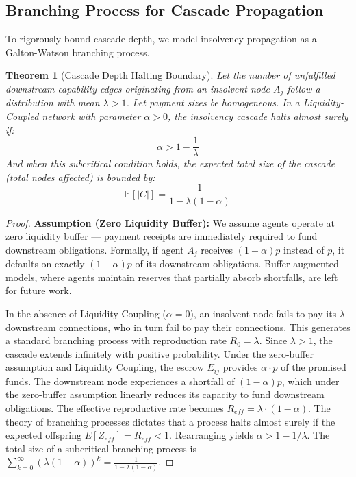 \documentclass[11pt]{article}
\newtheorem{theorem}{Theorem}[section]
\begin{document}
\subsection{Branching Process for Cascade Propagation}
To rigorously bound cascade depth, we model insolvency propagation as a Galton-Watson branching process.

\begin{theorem}[Cascade Depth Halting Boundary]
\label{thm:halting}
Let the number of unfulfilled downstream capability edges originating from an insolvent node $A_j$ follow a distribution with mean $\lambda > 1$. Let payment sizes be homogeneous. In a Liquidity-Coupled network with parameter $\alpha > 0$, the insolvency cascade halts almost surely if:
$$ \alpha > 1 - \frac{1}{\lambda} $$
And when this subcritical condition holds, the expected total size of the cascade (total nodes affected) is bounded by:
$$ \mathbb{E}[|C|] = \frac{1}{1 - \lambda(1-\alpha)} $$
\end{theorem}

\begin{proof}
\textbf{Assumption (Zero Liquidity Buffer):} We assume agents operate at zero liquidity buffer --- payment receipts are immediately required to fund downstream obligations. Formally, if agent $A_j$ receives $(1-\alpha)p$ instead of $p$, it defaults on exactly $(1-\alpha)p$ of its downstream obligations. Buffer-augmented models, where agents maintain reserves that partially absorb shortfalls, are left for future work.

In the absence of Liquidity Coupling ($\alpha=0$), an insolvent node fails to pay its $\lambda$ downstream connections, who in turn fail to pay their connections. This generates a standard branching process with reproduction rate $R_0 = \lambda$. Since $\lambda > 1$, the cascade extends infinitely with positive probability.
Under the zero-buffer assumption and Liquidity Coupling, the escrow $E_{ij}$ provides $\alpha \cdot p$ of the promised funds. The downstream node experiences a shortfall of $(1-\alpha)p$, which under the zero-buffer assumption linearly reduces its capacity to fund downstream obligations. The effective reproductive rate becomes $R_{eff} = \lambda \cdot (1-\alpha)$.
The theory of branching processes dictates that a process halts almost surely if the expected offspring $E[Z_{eff}] = R_{eff} < 1$. Rearranging yields $\alpha > 1 - 1/\lambda$. The total size of a subcritical branching process is $\sum_{k=0}^\infty (\lambda(1-\alpha))^k = \frac{1}{1 - \lambda(1-\alpha)}$.
\end{proof}
\end{document}
